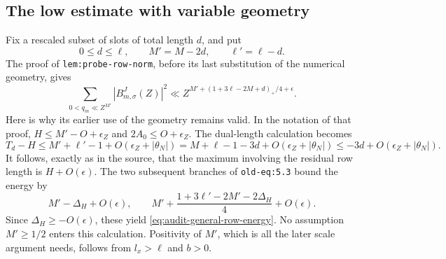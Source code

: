 \documentclass[11pt,a4paper]{article}
\numberwithin{equation}{section}
\theoremstyle{remark}
\begin{document}
\subsection{The low estimate with variable geometry}

Fix a rescaled subset of slots of total length \(d\), and put
\[
 0\le d\le\ell,\qquad M'=M-2d,\qquad \ell'=\ell-d.
\]
The proof of \texttt{lem:probe-row-norm}, before its last substitution
of the numerical geometry, gives
\begin{equation}
 \sum_{0<q_m\ll Z^{M'}}|B^J_{m,\sigma}(Z)|^2
 \ll Z^{M'+(1+3\ell-2M+d)_+/4+\epsilon}.
 \label{eq:audit-general-row-energy}
\end{equation}
Here is why its earlier use of the geometry remains valid.  In the
notation of that proof, \(H\le M'-O+\epsilon_Z\) and
\(2A_0\le O+\epsilon_Z\).  The dual-length calculation becomes
\[
 T_d-H\le M'+\ell'-1+O(\epsilon_Z+|\theta_N|)
 =M+\ell-1-3d+O(\epsilon_Z+|\theta_N|)
 \le-3d+O(\epsilon_Z+|\theta_N|).
\]
It follows, exactly as in the source, that the maximum involving the
residual row length is \(H+O(\epsilon)\).  The two subsequent branches
of \texttt{old-eq:5.3} bound the energy by
\[
 M'-\Delta_H+O(\epsilon),\qquad
 M'+\frac{1+3\ell'-2M'-2\Delta_H}{4}+O(\epsilon).
\]
Since \(\Delta_H\ge-O(\epsilon)\), these yield
\eqref{eq:audit-general-row-energy}.  No assumption \(M'\ge1/2\)
enters this calculation.  Positivity of \(M'\), which is all the later
scale argument needs, follows from \(l_x>\ell\) and \(b>0\).
\end{document}
